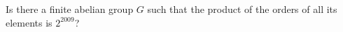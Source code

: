 Is there a finite abelian group $G$ such that the product of the
orders of all its elements is $2^{2009}$?
